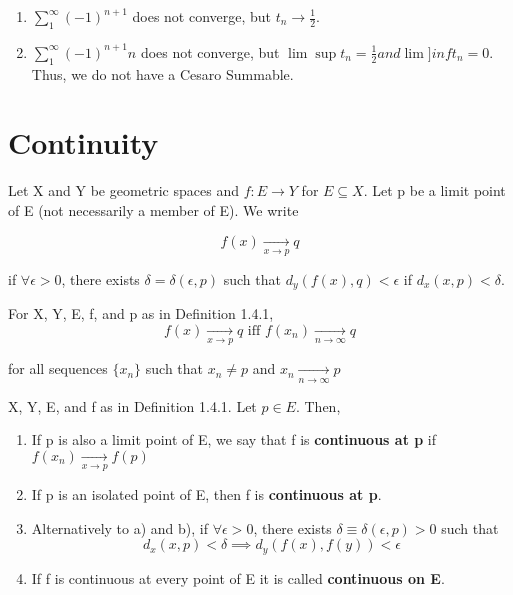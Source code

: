 \documentclass[11pt,fleqn]{book} %
\begin{document}
\begin{example}
	\begin{enumerate}[label = \alph*)]
		\item $\sum\limits^\infty_1 (-1)^{n+1}$ does not converge, but $t_n \rightarrow \frac{1}{2}$.
		\item $\sum\limits^\infty_1 (-1)^{n+1} n$ does not converge, but $\lim\sup t_n = \frac{1}{2} and \lim]inf t_n = 0$. Thus, we do not have a Cesaro Summable.
	\end{enumerate}
\end{example}

\section{Continuity}

\begin{definition}
	Let X and Y be geometric spaces and $f: E \rightarrow Y$ for $E \subseteq X$. Let p be a limit point of E (not necessarily a member of E). We write

	$$f(x) \underset{x \to p}{\rightarrow} q$$

	if $\forall \epsilon > 0$, there exists $\delta = \delta(\epsilon, p)$ such that $d_y(f(x), q) < \epsilon$ if $d_x(x, p) < \delta$.
\end{definition}

\begin{theorem}
	For X, Y, E, f, and p as in Definition 1.4.1, 
	$$f(x) \underset{x \to p}{\rightarrow} q \text{ iff } f(x_n) \underset{n \to \infty}{\rightarrow} q$$

	for all sequences $\{x_n\}$ such that $x_n \neq p$ and $x_n \underset{n \to \infty}{\rightarrow} p$
\end{theorem}

\begin{definition}
	X, Y, E, and f as in Definition 1.4.1. Let $p \in E$. Then, 
	\begin{enumerate}[label = \alph*)]
		\item If p is also a limit point of E, we say that f is \textbf{continuous at p} if $f(x_n) \underset{x \to p}{\rightarrow} f(p)$
		\item If p is an isolated point of E, then f is \textbf{continuous at p}.
		\item Alternatively to a) and b), if $\forall \epsilon > 0$, there exists $\delta \equiv \delta(\epsilon, p) > 0$ such that
		$$d_x(x,p) < \delta \implies d_y(f(x), f(y)) < \epsilon$$
		\item If f is continuous at every point of E it is called \textbf{continuous on E}.
	\end{enumerate}
\end{definition}
\end{document}
